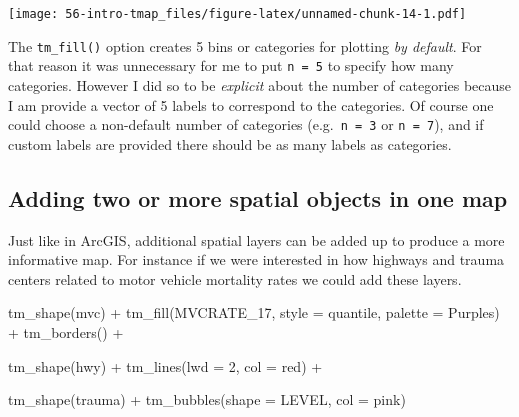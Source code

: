 \documentclass[
]{book}
\newenvironment{Shaded}{\begin{snugshade}}{\end{snugshade}}
\newcommand{\AttributeTok}[1]{\textcolor[rgb]{0.77,0.63,0.00}{#1}}
\newcommand{\DecValTok}[1]{\textcolor[rgb]{0.00,0.00,0.81}{#1}}
\newcommand{\FunctionTok}[1]{\textcolor[rgb]{0.00,0.00,0.00}{#1}}
\newcommand{\NormalTok}[1]{#1}
\newcommand{\SpecialCharTok}[1]{\textcolor[rgb]{0.00,0.00,0.00}{#1}}
\newcommand{\StringTok}[1]{\textcolor[rgb]{0.31,0.60,0.02}{#1}}
\newenvironment{rmdnote}[1]
  {
  \begin{itemize}
  \renewcommand{\labelitemi}{
    \raisebox{-.7\height}[0pt][0pt]{
      {\setkeys{Gin}{width=3em,keepaspectratio}\texttt{[image: images/\#1]}}
    }
  }
  \setlength{\fboxsep}{1em}
  \begin{note}
  \item
  }
  {
  \end{note}
  \end{itemize}
  }
\begin{document}
\texttt{[image: 56-intro-tmap\_files/figure-latex/unnamed-chunk-14-1.pdf]}

\begin{rmdnote}{note}
The \texttt{tm\_fill()} option creates 5 bins or categories for plotting \emph{by default}. For that reason it was unnecessary for me to put \texttt{n\ =\ 5} to specify how many categories. However I did so to be \emph{explicit} about the number of categories because I am provide a vector of 5 labels to correspond to the categories. Of course one could choose a non-default number of categories (e.g.~\texttt{n\ =\ 3} or \texttt{n\ =\ 7}), and if custom labels are provided there should be as many labels as categories.

\end{rmdnote}

\hypertarget{adding-two-or-more-spatial-objects-in-one-map}{%
\subsection{Adding two or more spatial objects in one map}\label{adding-two-or-more-spatial-objects-in-one-map}}

Just like in ArcGIS, additional spatial layers can be added up to produce a more informative map. For instance if we were interested in how highways and trauma centers related to motor vehicle mortality rates we could add these layers.

\begin{Shaded}
\begin{Highlighting}[]
\FunctionTok{tm\_shape}\NormalTok{(mvc) }\SpecialCharTok{+} 
  \FunctionTok{tm\_fill}\NormalTok{(}\StringTok{\textquotesingle{}MVCRATE\_17\textquotesingle{}}\NormalTok{,}
          \AttributeTok{style =} \StringTok{\textquotesingle{}quantile\textquotesingle{}}\NormalTok{,}
          \AttributeTok{palette =} \StringTok{\textquotesingle{}Purples\textquotesingle{}}\NormalTok{) }\SpecialCharTok{+}
  \FunctionTok{tm\_borders}\NormalTok{() }\SpecialCharTok{+}

\FunctionTok{tm\_shape}\NormalTok{(hwy) }\SpecialCharTok{+} 
  \FunctionTok{tm\_lines}\NormalTok{(}\AttributeTok{lwd =} \DecValTok{2}\NormalTok{, }\AttributeTok{col =} \StringTok{\textquotesingle{}red\textquotesingle{}}\NormalTok{) }\SpecialCharTok{+}
  
\FunctionTok{tm\_shape}\NormalTok{(trauma) }\SpecialCharTok{+} 
  \FunctionTok{tm\_bubbles}\NormalTok{(}\AttributeTok{shape =} \StringTok{\textquotesingle{}LEVEL\textquotesingle{}}\NormalTok{,}
             \AttributeTok{col =} \StringTok{\textquotesingle{}pink\textquotesingle{}}\NormalTok{)}
\end{Highlighting}
\end{Shaded}
\end{document}
